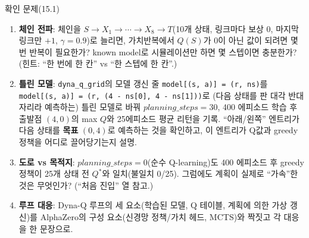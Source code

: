 \documentclass[aspectratio=169,11pt]{beamer}
\begin{document}
\begin{frame}{확인 문제(15.1)}
  \small
  \begin{enumerate}
    \item \textbf{체인 전파}: 체인을 $S \to X_1 \to \cdots \to X_8
      \to T$(10개 상태, 링크마다 보상 0, 마지막 링크만 $+1$,
      $\gamma=0.9$)로 늘리면, 가치반복에서 $Q(S)$가 0이 아닌 값이
      되려면 몇 번 반복이 필요한가? known model로 시뮬레이션만
      하면 몇 스텝이면 충분한가? (힌트: ``한 번에 한 칸'' vs
      ``한 스텝에 한 칸''.)
    \item \textbf{틀린 모델}: \texttt{dyna\_q\_grid}의 모델 갱신 줄
      \texttt{model[(s, a)] = (r, ns)}를
      \texttt{model[(s, a)] = (r, (4 - ns[0], 4 - ns[1]))}로
      (다음 상태를 판 대각 반대 자리라 예측하는) 틀린 모델로 바꿔
      $planning\_steps{=}30$, 400 에피소드 학습 후 출발점
      $(4,0)$의 max $Q$와 25에피소드 평균 리턴을 기록.
      ``아래/왼쪽'' 엔트리가 다음 상태를 \textbf{목표} $(0,4)$로
      예측하는 것을 확인하고, 이 엔트리가 Q값과 greedy 정책을
      어디로 끌어당기는지 설명.
    \item \textbf{도로 vs 목적지}: $planning\_steps{=}0$(순수
      Q-learning)도 400 에피소드 후 greedy 정책이 25개 상태 전
      $Q^{*}$와 일치(불일치 0/25). 그럼에도 계획이 실제로
      ``가속''한 것은 무엇인가? (``처음 진입'' 열 참고.)
    \item \textbf{루프 대응}: Dyna-Q 루프의 세 요소(학습된 모델,
      Q 테이블, 계획에 의한 가상 갱신)를 AlphaZero의 구성
      요소(신경망 정책/가치 헤드, MCTS)와 짝짓고 각 대응을
      한 문장으로.
  \end{enumerate}
\end{frame}
\end{document}
